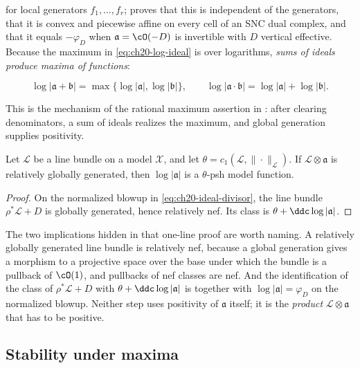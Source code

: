 for local generators \(f_1,\dots,f_r\); 
proves that this is independent of the generators, that it is convex and
piecewise affine on every cell of an SNC dual complex, and that it equals
\(-\varphi_D\) when \(\mathfrak a=\cO(-D)\) is invertible with \(D\)
vertical effective.  Because the maximum in \eqref{eq:ch20-log-ideal} is
over logarithms, \emph{sums of ideals produce maxima of functions}:

\begin{equation}
\label{eq:ch20-ideal-sum-max}
 \log|\mathfrak a+\mathfrak b|
 =\max\{\log|\mathfrak a|,\log|\mathfrak b|\},
 \qquad
 \log|\mathfrak a\cdot\mathfrak b|
 =\log|\mathfrak a|+\log|\mathfrak b| .
\end{equation}

This is the mechanism of the rational maximum assertion in
: after clearing denominators, a sum of ideals
realizes the maximum, and global generation supplies positivity.

\begin{lemma}\label{lem:ch20-generated-ideal-psh}
Let \(\mathcal L\) be a line bundle on a model \(\mathcal X\), and let
\(\theta=c_1(\mathcal L,\|\cdot\|_{\mathcal L})\).  If
\(\mathcal L\otimes\mathfrak a\) is relatively globally generated, then
\(\log|\mathfrak a|\) is a \(\theta\)-psh model function.
\end{lemma}

\begin{proof}
On the normalized blowup in \eqref{eq:ch20-ideal-divisor}, the line bundle
\(\rho^*\mathcal L+D\) is globally generated, hence relatively nef.  Its
class is \(\theta+\ddc\log|\mathfrak a|\).
\end{proof}

The two implications hidden in that one-line proof are worth naming.  A
relatively globally generated line bundle is relatively nef, because a
global generation gives a morphism to a projective space over the base under
which the bundle is a pullback of \(\cO(1)\), and pullbacks of nef classes
are nef.  And the identification of the class of \(\rho^*\mathcal L+D\) with
\(\theta+\ddc\log|\mathfrak a|\) is
 together with
\(\log|\mathfrak a|=\varphi_D\) on the normalized blowup.  Neither step uses
positivity of \(\mathfrak a\) itself; it is the \emph{product}
\(\mathcal L\otimes\mathfrak a\) that has to be positive.

\subsection{Stability under maxima}
\label{sec:ch20-max}

